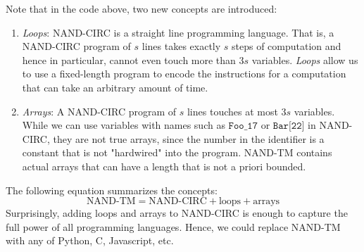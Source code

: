   Note that in the code above, two new concepts are introduced: 
  \begin{enumerate}
      \item \textit{Loops}: NAND-CIRC is a straight line programming language. That is, a NAND-CIRC program of $s$ lines takes exactly $s$ steps of computation and hence in particular, cannot even touch more than $3s$ variables. \textit{Loops} allow us to use a fixed-length program to encode the instructions for a computation that can take an arbitrary amount of time. 
      \item \textit{Arrays}: A NAND-CIRC program of $s$ lines touches at most $3s$ variables. While we can use variables with names such as $\texttt{Foo\_17}$ or $\texttt{Bar[22]}$ in NAND-CIRC, they are not true arrays, since the number in the identifier is a constant that is not "hardwired" into the program. NAND-TM contains actual arrays that can have a length that is not a priori bounded. 
  \end{enumerate}
  The following equation summarizes the concepts: 
  \begin{equation}
    \text{NAND-TM} = \text{NAND-CIRC} + \text{loops} + \text{arrays}
  \end{equation}
  Surprisingly, adding loops and arrays to NAND-CIRC is enough to capture the full power of all programming languages. Hence, we could replace NAND-TM with any of Python, C, Javascript, etc. 

